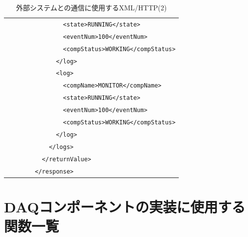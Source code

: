 \documentclass[a4j,10pt,dvips,onecolumn,oneside,final]{jarticle}%
\begin{document}
\begin{table}[htbp]
\begin{center}
{\begin{tabular}{|l|c|c|l|l|}
                  &           &      &                                            & \verb|        <state>RUNNING</state>|\\
                  &           &      &                                            & \verb|        <eventNum>100</eventNum>|\\
                  &           &      &                                            & \verb|        <compStatus>WORKING</compStatus>|\\
                  &           &      &                                            & \verb|      </log>|\\
                  &           &      &                                            & \verb|      <log>|\\
                  &           &      &                                            & \verb|        <compName>MONITOR</compName>|\\
                  &           &      &                                            & \verb|        <state>RUNNING</state>|\\
                  &           &      &                                            & \verb|        <eventNum>100</eventNum>|\\
                  &           &      &                                            & \verb|        <compStatus>WORKING</compStatus>|\\
                  &           &      &                                            & \verb|      </log>|\\
                  &           &      &                                            & \verb|    </logs>|\\
                  &           &      &                                            & \verb|  </returnValue>|\\ 
                  &           &      &                                            & \verb|</response>|\\ \hline

    \end{tabular}
    \caption{外部システムとの通信に使用するXML/HTTP(2)}\label{http2.tab}

}
\end{center}
\end{table}

\newpage
\section{DAQコンポーネントの実装に使用する関数一覧}\label{funclist}
\end{document}
